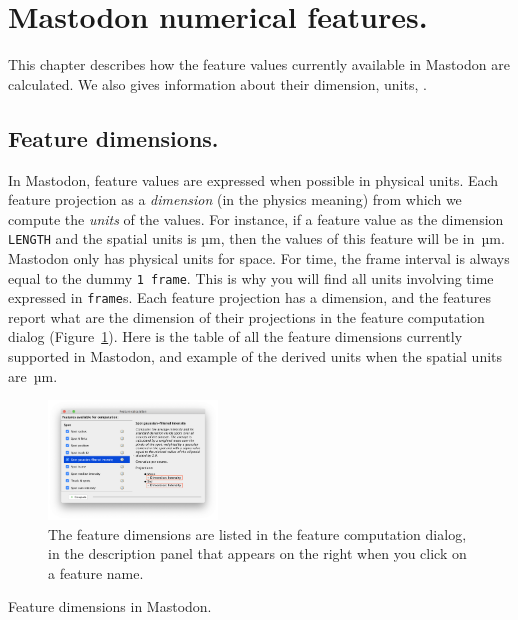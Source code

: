 \section{Mastodon numerical features.}
\label{FeaturesExplanation}

This chapter describes how the feature values currently available in Mastodon are calculated. 
We also gives information about their dimension, units, \etc.

\subsection{Feature dimensions.}

In Mastodon, feature values are expressed when possible in physical units. 
Each feature projection as a \textit{dimension} (in the physics meaning) from which we compute the \textit{units} of the values.
For instance, if a feature value as the dimension \texttt{LENGTH} and the spatial units is µm, then the values of this feature will be in~µm.
Mastodon only has physical units for space. 
For time, the frame interval is always equal to the dummy \texttt{1~frame}.
This is why you will find all units involving time expressed in \texttt{frame}s.
Each feature projection has a dimension, and the features report what are the dimension of their projections in the feature computation dialog (Figure~\ref{fig:FindFeatureDimension}).
Here is the table of all the feature dimensions currently supported in Mastodon, and example of the derived units when the spatial units are~µm.

\begin{figure}
    \centering
    \includegraphics[width=0.4\textwidth]{figures/Mastodon_FindFeatureDimension.png}
    \caption{The feature dimensions are listed in the feature computation dialog, in the description panel that appears on the right when you click on a feature name.}
    \label{fig:FindFeatureDimension}
\end{figure}

\begin{table}
    \centering
    \footnotesize
    
    \caption{Feature dimensions in Mastodon.}
    \label{tab:FeatureDimensions}
\end{table}

